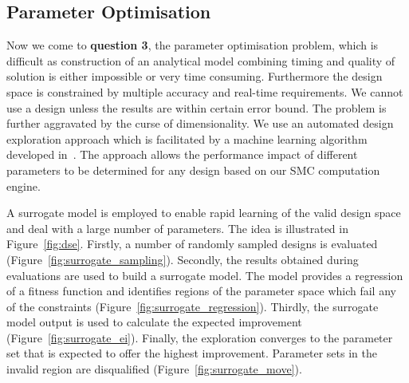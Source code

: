 \subsection{Parameter Optimisation}
\label{sec:dse}

Now we come to \textbf{question 3}, the parameter optimisation problem, which is difficult as construction of an analytical model combining timing and quality of solution is either impossible or very time consuming. 
Furthermore the design space is constrained by multiple accuracy and real-time requirements.
We cannot use a design unless the results are within certain error bound.
The problem is further aggravated by the curse of dimensionality.
We use an automated design exploration approach which is facilitated by a machine learning algorithm developed in~\cite{kurek14}.
The approach allows the performance impact of different parameters to be determined for any design based on our SMC computation engine. 

A surrogate model is employed to enable rapid learning of the valid design space and deal with a large number of parameters.
The idea is illustrated in Figure~\ref{fig:dse}.
Firstly, a number of randomly sampled designs is evaluated (Figure~\ref{fig:surrogate_sampling}).
Secondly, the results obtained during evaluations are used to build a surrogate model.
The model provides a regression of a fitness function and identifies regions of the parameter space which fail any of the constraints (Figure~\ref{fig:surrogate_regression}).
Thirdly, the surrogate model output is used to calculate the expected improvement (Figure~\ref{fig:surrogate_ei}).
Finally, the exploration converges to the parameter set that is expected to offer the highest improvement.
Parameter sets in the invalid region are disqualified (Figure~\ref{fig:surrogate_move}).

